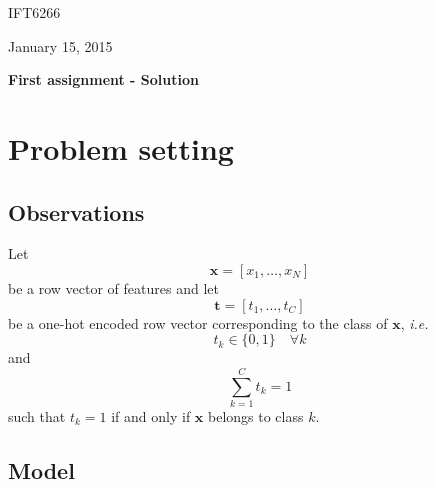 \documentclass{article}
\def\duedate{January 15, 2015}
\def\class{IFT6266}
\def\title{First assignment - Solution}
\begin{document}
\begin{titlepage}
\begin{center}
\begin{minipage}{0.5\textwidth}
\begin{flushleft} \large
\class
\end{flushleft}
\end{minipage}
\begin{minipage}{0.49\textwidth}
\begin{flushright} \large
\duedate
\end{flushright}
\end{minipage}
\vspace{1cm}
\Large \textbf{\title}
\end{center}
\end{titlepage}


\section*{Problem setting}

\subsection*{Observations}

Let
\begin{equation}
    \mathbf{x} = [x_1, \ldots, x_N]
\end{equation}
be a row vector of features and let
\begin{equation}
    \mathbf{t} = [t_1, \ldots, t_C]
\end{equation}
be a one-hot encoded row vector corresponding to the class of $\mathbf{x}$,
\emph{i.e.}
\begin{equation}
t_k \in \{0, 1\} \quad \forall k
\end{equation}
and
\begin{equation}
    \sum_{k=1}^C t_k = 1
\end{equation}
such that $t_k = 1$ if and only if $\mathbf{x}$ belongs to class $k$.

\subsection*{Model}
\end{document}
